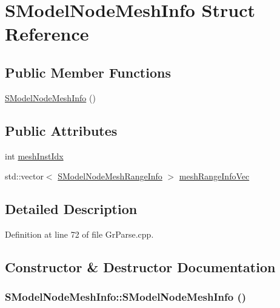 \hypertarget{struct_s_model_node_mesh_info}{
\section{SModelNodeMeshInfo Struct Reference}
\label{struct_s_model_node_mesh_info}
}
\subsection*{Public Member Functions}
\begin{CompactItemize}
\item 
\hyperlink{struct_s_model_node_mesh_info_c91d4c335ea0874716fb08afaaccfe55}{SModelNodeMeshInfo} ()
\end{CompactItemize}
\subsection*{Public Attributes}
\begin{CompactItemize}
\item 
int \hyperlink{struct_s_model_node_mesh_info_9320f806f5614c5b16b0f6bfa49a94f1}{meshInstIdx}
\item 
std::vector$<$ \hyperlink{struct_s_model_node_mesh_range_info}{SModelNodeMeshRangeInfo} $>$ \hyperlink{struct_s_model_node_mesh_info_b75268dc7305f850ff82b777f59b61f1}{meshRangeInfoVec}
\end{CompactItemize}


\subsection{Detailed Description}


Definition at line 72 of file GrParse.cpp.

\subsection{Constructor \& Destructor Documentation}
\hypertarget{struct_s_model_node_mesh_info_c91d4c335ea0874716fb08afaaccfe55}{
\subsubsection[{SModelNodeMeshInfo}]{\setlength{\rightskip}{0pt plus 5cm}SModelNodeMeshInfo::SModelNodeMeshInfo ()}}
\label{struct_s_model_node_mesh_info_c91d4c335ea0874716fb08afaaccfe55}





